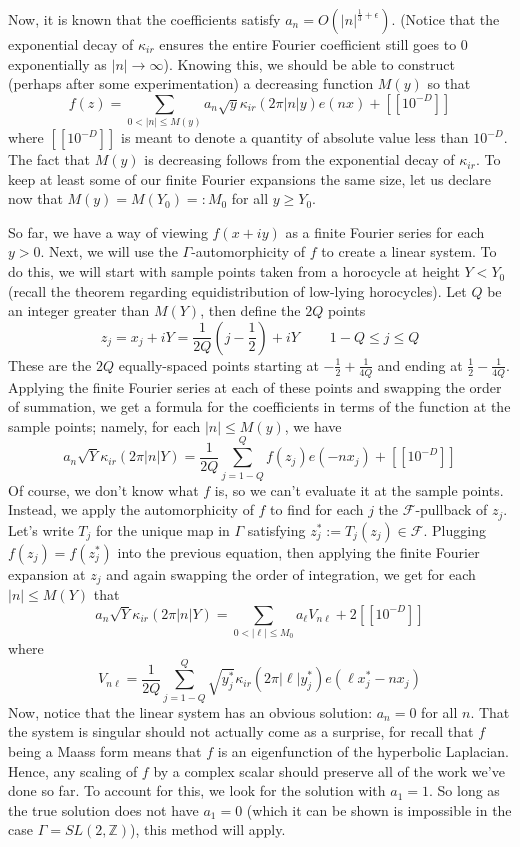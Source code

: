 \documentclass[]{article}
\begin{document}
Now, it is known that the coefficients satisfy $a_n = O(|n|^{\frac{1}{3} + \epsilon})$.
(Notice that the exponential decay of $\kappa_{ir}$ ensures the entire Fourier coefficient still goes to $0$ exponentially as $|n| \rightarrow \infty$).
Knowing this, we should be able to construct (perhaps after some experimentation) a decreasing function $M(y)$ so that
$$
f(z) = \sum_{0 < |n| \leq M(y)}a_n\sqrt{y}\kappa_{ir}(2\pi|n|y)e(nx) + [[10^{-D}]]
$$
where $[[10^{-D}]]$ is meant to denote a quantity of absolute value less than $10^{-D}$.
The fact that $M(y)$ is decreasing follows from the exponential decay of $\kappa_{ir}$.
To keep at least some of our finite Fourier expansions the same size, let us declare now that $M(y) = M(Y_0) =: M_0$ for all $y \geq Y_0$.

So far, we have a way of viewing $f(x + iy)$ as a finite Fourier series for each $y > 0$.
Next, we will use the $\Gamma$-automorphicity of $f$ to create a linear system.
To do this, we will start with sample points taken from a horocycle at height $Y < Y_0$ (recall the theorem regarding equidistribution of low-lying horocycles).
Let $Q$ be an integer greater than $M(Y)$, then define the $2Q$ points
$$
z_j = x_j + iY = \frac{1}{2Q}\left( j - \frac{1}{2} \right) + iY ~~~~~~~~~~
1 - Q \leq j \leq Q
$$
These are the $2Q$ equally-spaced points starting at $-\frac{1}{2} + \frac{1}{4Q}$ and ending at $\frac{1}{2} - \frac{1}{4Q}$.
Applying the finite Fourier series at each of these points and swapping the order of summation, we get a formula for the coefficients in terms of the function at the sample points; namely, for each $|n| \leq M(y)$, we have
$$
a_n\sqrt{Y}\kappa_{ir}(2\pi|n|Y) = \frac{1}{2Q}\sum_{j=1-Q}^{Q}f(z_j)e(-nx_j) + [[10^{-D}]]
$$
Of course, we don't know what $f$ is, so we can't evaluate it at the sample points.
Instead, we apply the automorphicity of $f$ to find for each $j$ the $\mathcal{F}$-pullback of $z_j$.
Let's write $T_j$ for the unique map in $\Gamma$ satisfying $z_j^* := T_j(z_j) \in \mathcal{F}$.
Plugging $f(z_j) = f(z_j^*)$ into the previous equation, then applying the finite Fourier expansion at $z_j$ and again swapping the order of integration, we get for each $|n| \leq M(Y)$ that
\begin{equation}\label{linSys}
a_n\sqrt{Y}\kappa_{ir}(2\pi|n|Y) = \sum_{0 < |\ell| \leq M_0}a_\ell V_{n\ell} + 2[[10^{-D}]]
\end{equation}
where
$$
V_{n\ell} = \frac{1}{2Q}\sum_{j=1-Q}^{Q}\sqrt{y_j^*}\kappa_{ir}(2\pi|\ell|y_j^*)e(\ell x_j^* - nx_j)
$$
Now, notice that the linear system has an obvious solution: $a_n = 0$ for all $n$.
That the system is singular should not actually come as a surprise, for recall that $f$ being a Maass form means that $f$ is an eigenfunction of the hyperbolic Laplacian.
Hence, any scaling of $f$ by a complex scalar should preserve all of the work we've done so far.
To account for this, we look for the solution with $a_1 = 1$.
So long as the true solution does not have $a_1 = 0$ (which it can be shown is impossible in the case $\Gamma = SL(2, \mathbb{Z})$), this method will apply.
\end{document}
